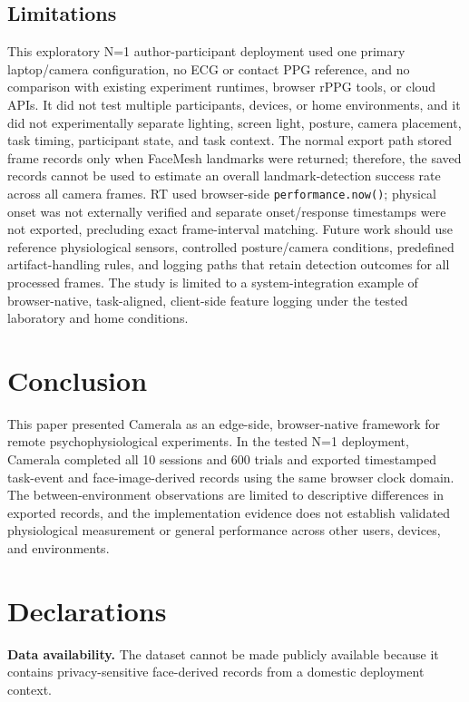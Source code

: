 \documentclass[dvipdfmx]{ehis}
\begin{document}
\subsection{Limitations}
This exploratory N=1 author-participant deployment used one primary laptop/camera configuration, no ECG or contact PPG reference, and no comparison with existing experiment runtimes, browser rPPG tools, or cloud APIs.
It did not test multiple participants, devices, or home environments, and it did not experimentally separate lighting, screen light, posture, camera placement, task timing, participant state, and task context.
The normal export path stored frame records only when FaceMesh landmarks were returned; therefore, the saved records cannot be used to estimate an overall landmark-detection success rate across all camera frames.
RT used browser-side \texttt{performance.now()}; physical onset was not externally verified and separate onset/response timestamps were not exported, precluding exact frame-interval matching.
Future work should use reference physiological sensors, controlled posture/camera conditions, predefined artifact-handling rules, and logging paths that retain detection outcomes for all processed frames.
The study is limited to a system-integration example of browser-native, task-aligned, client-side feature logging under the tested laboratory and home conditions.

\section{Conclusion}
This paper presented Camerala as an edge-side, browser-native framework for remote psychophysiological experiments.
In the tested N=1 deployment, Camerala completed all 10 sessions and 600 trials and exported timestamped task-event and face-image-derived records using the same browser clock domain.
The between-environment observations are limited to descriptive differences in exported records, and the implementation evidence does not establish validated physiological measurement or general performance across other users, devices, and environments.

\enlargethispage{2\baselineskip}
\section*{Declarations}
\textbf{Data availability.}
The dataset cannot be made publicly available because it contains privacy-sensitive face-derived records from a domestic deployment context.
\end{document}
